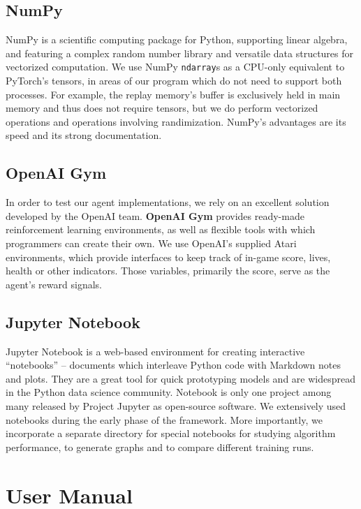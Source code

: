 \subsection{NumPy}
NumPy is a scientific computing package for Python, supporting linear algebra, and featuring a complex random number library and versatile data structures for vectorized computation.
We use NumPy \verb|ndarray|s as a CPU-only equivalent to PyTorch's tensors, in areas of our program which do not need to support both processes.
For example, the replay memory's buffer is exclusively held in main memory and thus does not require tensors, but we do perform vectorized operations and operations involving randimization.
NumPy's advantages are its speed and its strong documentation.

\subsection{OpenAI Gym}
In order to test our agent implementations, we rely on an excellent solution developed by the OpenAI team.
\textbf{OpenAI Gym} \cite{openai-gym} provides ready-made reinforcement learning environments, as well as flexible tools with which programmers can create their own.
We use OpenAI's supplied Atari environments, which provide interfaces to keep track of in-game score, lives, health or other indicators.
Those variables, primarily the score, serve as the agent's reward signals.

\subsection{Jupyter Notebook}
Jupyter Notebook is a web-based environment for creating interactive ``notebooks'' -- documents which interleave Python code with Markdown notes and plots.
They are a great tool for quick prototyping models and are widespread in the Python data science community.
Notebook is only one project among many released by Project Jupyter as open-source software.
We extensively used notebooks during the early phase of the framework.
More importantly, we incorporate a separate directory for special notebooks for studying algorithm performance, to generate graphs and to compare different training runs.

\section{User Manual} \label{section:user-manual}
